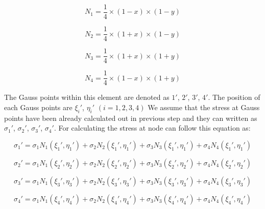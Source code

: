 \begin{equation}
N_1 = \frac{1}{4}\times\left(1 - x\right) \times \left(1 - y \right) 
\end{equation}  

\begin{equation}
N_2 = \frac{1}{4}\times\left(1 + x\right) \times \left(1 - y \right) 
\end{equation}  

\begin{equation}
N_3 = \frac{1}{4}\times\left(1 + x\right) \times \left(1 + y \right) 
\end{equation}  

\begin{equation}
N_4 = \frac{1}{4}\times\left(1 - x\right) \times \left(1 + y \right) 
\end{equation}  

The Gauss points within this element are denoted as $1'$, $2'$, $3'$, $4'$. The position of each Gauss points are ${\xi_i}'$, ${\eta_i}'$ $\left(i = 1, 2, 3, 4\right)$ We assume that the stress at Gauss points have been already calculated out in previous step and they can written as ${\sigma_1}'$, ${\sigma_2}'$, ${\sigma_3}'$, ${\sigma_4}'$. For calculating the stress at node  can follow this equation as:

\begin{equation}
{\sigma_1}' = \sigma_1 N_1\left({\xi_1}', {\eta_1}'\right) + \sigma_2 N_2\left({\xi_1}', {\eta_1}'\right) + \sigma_3 N_3\left({\xi_1}', {\eta_1}'\right) + \sigma_4 N_4\left({\xi_1}', {\eta_1}'\right)
\end{equation}

\begin{equation}
{\sigma_2}' = \sigma_1 N_1\left({\xi_2}', {\eta_2}'\right) + \sigma_2 N_2\left({\xi_2}', {\eta_2}'\right) + \sigma_3 N_3\left({\xi_2}', {\eta_2}'\right) + \sigma_4 N_4\left({\xi_2}', {\eta_2}'\right)
\end{equation}

\begin{equation}
{\sigma_3}' = \sigma_1 N_1\left({\xi_3}', {\eta_3}'\right) + \sigma_2 N_2\left({\xi_3}', {\eta_3}'\right) + \sigma_3 N_3\left({\xi_3}', {\eta_3}'\right) + \sigma_4 N_4\left({\xi_3}', {\eta_3}'\right)
\end{equation}

\begin{equation}
{\sigma_4}' = \sigma_1 N_1\left({\xi_4}', {\eta_4}'\right) + \sigma_2 N_2\left({\xi_4}', {\eta_4}'\right) + \sigma_3 N_3\left({\xi_4}', {\eta_4}'\right) + \sigma_4 N_4\left({\xi_4}', {\eta_4}'\right)
\end{equation}

